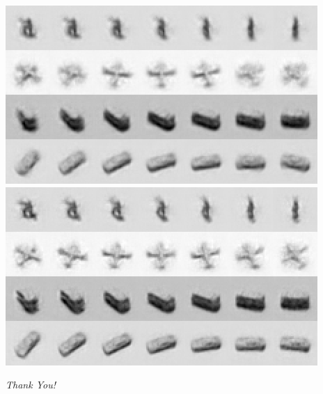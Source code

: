 \documentclass{beamer}
\begin{document}
\begin{frame}
\begin{centering}
\includegraphics[scale=0.3]{./Figures/Project2/taco/interp_nodelta.png} \hspace{0.25cm} 
\includegraphics[scale=0.3]{./Figures/Project2/taco/interp_delta.png}\\
\end{centering} 
\end{frame} 

\begin{frame}
\begin{center} 
\huge \color{blue} \emph{Thank You!}
\end{center} 
\end{frame}
\end{document}
